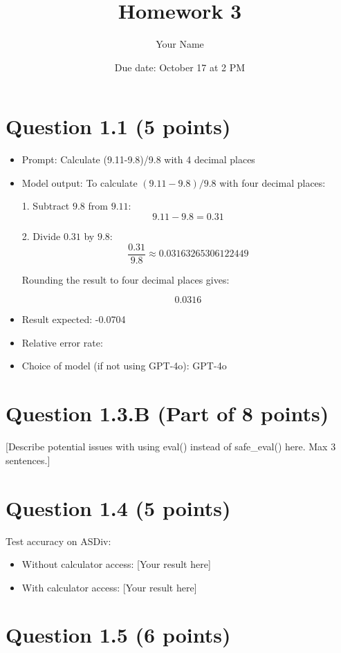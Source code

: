 \documentclass{article}
\title{Homework 3}
\author{Your Name}
\date{Due date: October 17 at 2 PM}
\begin{document}
\maketitle

\section*{Question 1.1 (5 points)}

\begin{itemize}
    \item Prompt: Calculate (9.11-9.8)/9.8 with 4 decimal places
    \item Model output: To calculate \((9.11 - 9.8) / 9.8\) with four decimal places:

        1. Subtract \(9.8\) from \(9.11\):
           \[ 9.11 - 9.8 = 0.31 \]
        
        2. Divide \(0.31\) by \(9.8\):
           \[ \frac{0.31}{9.8} \approx 0.03163265306122449 \]
        
        Rounding the result to four decimal places gives:
        
        \[ 0.0316 \]
    \item Result expected: -0.0704
    \item Relative error rate: 
    \item Choice of model (if not using GPT-4o): GPT-4o
\end{itemize}

\section*{Question 1.3.B (Part of 8 points)}

[Describe potential issues with using eval() instead of safe\_eval() here. Max 3 sentences.]

\section*{Question 1.4 (5 points)}

Test accuracy on ASDiv:
\begin{itemize}
    \item Without calculator access: [Your result here]
    \item With calculator access: [Your result here]
\end{itemize}

\section*{Question 1.5 (6 points)}
\end{document}
